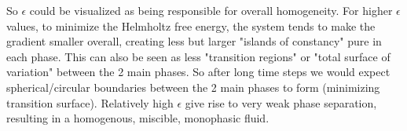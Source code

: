 \documentclass[a4paper]{article}
\begin{document}
So $\epsilon$ could be visualized as being responsible for overall homogeneity.
For higher $\epsilon$ values, to minimize the Helmholtz free energy, the system tends to make the gradient smaller overall, creating less but larger "islands of constancy" pure in each phase.
This can also be seen as less "transition regions" or "total surface of variation" between the 2 main phases.
So after long time steps we would expect spherical/circular boundaries between the 2 main phases to form (minimizing transition surface).
Relatively high $\epsilon$ give rise to very weak phase separation, resulting in a homogenous, miscible, monophasic fluid.
\end{document}
